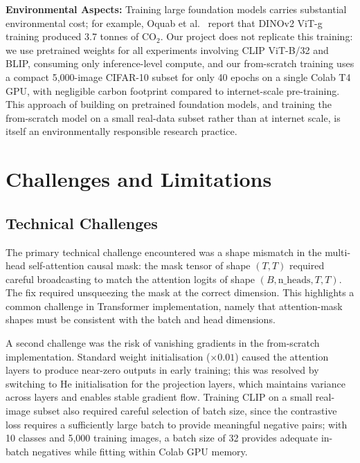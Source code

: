 \documentclass{iutbscthesis}
\begin{document}
\textbf{Environmental Aspects:}
Training large foundation models carries substantial environmental cost; for example, Oquab et al.\ \cite{oquab2024dinov2} report that DINOv2 ViT-g training produced 3.7 tonnes of CO$_2$. Our project does not replicate this training: we use pretrained weights for all experiments involving CLIP ViT-B/32 and BLIP, consuming only inference-level compute, and our from-scratch training uses a compact 5{,}000-image CIFAR-10 subset for only 40 epochs on a single Colab T4 GPU, with negligible carbon footprint compared to internet-scale pre-training. This approach of building on pretrained foundation models, and training the from-scratch model on a small real-data subset rather than at internet scale, is itself an environmentally responsible research practice.

\chapter{Challenges and Limitations}

\section{Technical Challenges} \label{sec:techchallenges}

The primary technical challenge encountered was a shape mismatch in the multi-head self-attention causal mask: the mask tensor of shape $(T, T)$ required careful broadcasting to match the attention logits of shape $(B, \text{n\_heads}, T, T)$. The fix required unsqueezing the mask at the correct dimension. This highlights a common challenge in Transformer implementation, namely that attention-mask shapes must be consistent with the batch and head dimensions.

A second challenge was the risk of vanishing gradients in the from-scratch implementation. Standard weight initialisation ($\times 0.01$) caused the attention layers to produce near-zero outputs in early training; this was resolved by switching to He initialisation for the projection layers, which maintains variance across layers and enables stable gradient flow. Training CLIP on a small real-image subset also required careful selection of batch size, since the contrastive loss requires a sufficiently large batch to provide meaningful negative pairs; with 10 classes and 5{,}000 training images, a batch size of 32 provides adequate in-batch negatives while fitting within Colab GPU memory.
\end{document}
